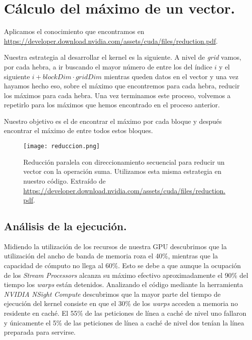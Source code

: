 \section{Cálculo del máximo de un vector.}

Aplicamos el conocimiento que encontramos en \url{https://developer.download.nvidia.com/assets/cuda/files/reduction.pdf}.

Nuestra estrategia al desarrollar el kernel es la siguiente.
A nivel de \textit{grid} vamos, por cada hebra, a ir buscando
el mayor número de entre los del índice $i$ y el siguiente
$i+blockDim\cdot gridDim$ mientras queden datos en el vector y una
vez hayamos hecho eso, sobre el máximo que encontremos para cada hebra,
reducir los máximos para cada hebra. Una vez terminamos este proceso,
volvemos a repetirlo para los máximos que hemos encontrado en el proceso
anterior.

Nuestro objetivo es el de encontrar el máximo por cada bloque y
después encontrar el máximo de entre todos estos bloques.

\begin{figure}[H]
    \centering
    \texttt{[image: reduccion.png]}
    \caption{Reducción paralela con direccionamiento secuencial para reducir un vector con la operación suma.
        Utilizamos esta misma estrategia en nuestro código.
        Extraído de \url{https://developer.download.nvidia.com/assets/cuda/files/reduction.pdf}.}
\end{figure}

\subsection{Análisis de la ejecución.}

Midiendo la utilización de los recursos de nuestra GPU descubrimos que la utilización del ancho de banda de memoria roza el
40\%, mientras que la capacidad de cómputo no llega al 60\%. Esto se debe a que aunque la ocupación de los \textit{Stream Processors}
alcanza su máximo efectivo aproximadamente el 90\% del tiempo los \textit{warps} están detenidos.
Analizando el código mediante la herramienta \textit{NVIDIA NSight Compute} descubrimos que la mayor parte del tiempo de ejecución
del kernel consiste en que el 30\% de los \textit{warps} acceden a memoria no residente en caché. El 55\% de las peticiones
de línea a caché de nivel uno fallaron y únicamente el 5\% de las peticiones de línea a caché de nivel dos tenían la línea preparada
para servirse. 

